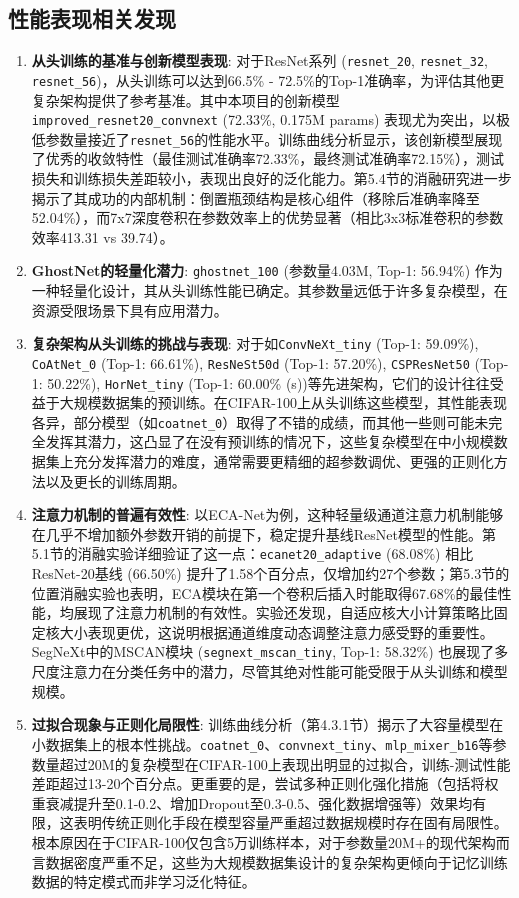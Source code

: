 \documentclass[a4paper]{article}
\begin{document}
\begin{description}
\subsection{性能表现相关发现}
\begin{enumerate}
    \item \textbf{从头训练的基准与创新模型表现}: 对于ResNet系列 (\texttt{resnet\_20}, \texttt{resnet\_32}, \texttt{resnet\_56})，从头训练可以达到66.5\% - 72.5\%的Top-1准确率，为评估其他更复杂架构提供了参考基准。其中本项目的创新模型\texttt{improved\_resnet20\_convnext} (72.33\%, 0.175M params) 表现尤为突出，以极低参数量接近了\texttt{resnet\_56}的性能水平。训练曲线分析显示，该创新模型展现了优秀的收敛特性（最佳测试准确率72.33\%，最终测试准确率72.15\%），测试损失和训练损失差距较小，表现出良好的泛化能力。第5.4节的消融研究进一步揭示了其成功的内部机制：倒置瓶颈结构是核心组件（移除后准确率降至52.04\%），而7x7深度卷积在参数效率上的优势显著（相比3x3标准卷积的参数效率413.31 vs 39.74）。
    \item \textbf{GhostNet的轻量化潜力}: \texttt{ghostnet\_100} (参数量4.03M, Top-1: 56.94\%) 作为一种轻量化设计，其从头训练性能已确定。其参数量远低于许多复杂模型，在资源受限场景下具有应用潜力。
    \item \textbf{复杂架构从头训练的挑战与表现}: 对于如\texttt{ConvNeXt\_tiny} (Top-1: 59.09\%), \texttt{CoAtNet\_0} (Top-1: 66.61\%), \texttt{ResNeSt50d} (Top-1: 57.20\%), \texttt{CSPResNet50} (Top-1: 50.22\%), \texttt{HorNet\_tiny} (Top-1: 60.00\% (s))等先进架构，它们的设计往往受益于大规模数据集的预训练。在CIFAR-100上从头训练这些模型，其性能表现各异，部分模型（如\texttt{coatnet\_0}）取得了不错的成绩，而其他一些则可能未完全发挥其潜力，这凸显了在没有预训练的情况下，这些复杂模型在中小规模数据集上充分发挥潜力的难度，通常需要更精细的超参数调优、更强的正则化方法以及更长的训练周期。
    \item \textbf{注意力机制的普遍有效性}: 以ECA-Net为例，这种轻量级通道注意力机制能够在几乎不增加额外参数开销的前提下，稳定提升基线ResNet模型的性能。第5.1节的消融实验详细验证了这一点：\texttt{ecanet20\_adaptive} (68.08\%) 相比ResNet-20基线 (66.50\%) 提升了1.58个百分点，仅增加约27个参数；第5.3节的位置消融实验也表明，ECA模块在第一个卷积后插入时能取得67.68\%的最佳性能，均展现了注意力机制的有效性。实验还发现，自适应核大小计算策略比固定核大小表现更优，这说明根据通道维度动态调整注意力感受野的重要性。SegNeXt中的MSCAN模块 (\texttt{segnext\_mscan\_tiny}, Top-1: 58.32\%) 也展现了多尺度注意力在分类任务中的潜力，尽管其绝对性能可能受限于从头训练和模型规模。
    \item \textbf{过拟合现象与正则化局限性}: 训练曲线分析（第4.3.1节）揭示了大容量模型在小数据集上的根本性挑战。\texttt{coatnet\_0}、\texttt{convnext\_tiny}、\texttt{mlp\_mixer\_b16}等参数量超过20M的复杂模型在CIFAR-100上表现出明显的过拟合，训练-测试性能差距超过13-20个百分点。更重要的是，尝试多种正则化强化措施（包括将权重衰减提升至0.1-0.2、增加Dropout至0.3-0.5、强化数据增强等）效果均有限，这表明传统正则化手段在模型容量严重超过数据规模时存在固有局限性。根本原因在于CIFAR-100仅包含5万训练样本，对于参数量20M+的现代架构而言数据密度严重不足，这些为大规模数据集设计的复杂架构更倾向于记忆训练数据的特定模式而非学习泛化特征。

\end{enumerate}
\end{description}
\end{document}
